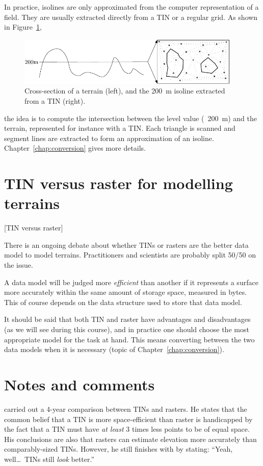 %

In practice, isolines are only approximated from the computer representation of a field.
They are usually extracted directly from a TIN or a regular grid. 
As shown in Figure~\ref{fig:isoline},
\begin{figure}
  \centering
  \includegraphics[width=0.95\textwidth]{figs/isoline}
  \caption{Cross-section of a terrain (left), and the \qty{200}{\metre} isoline extracted from a TIN (right).} 
\label{fig:isoline}
\end{figure}
the idea is to compute the intersection between the level value (\eg\ \qty{200}{m}) and the terrain, represented for instance with a TIN\@. 
Each triangle is scanned and segment lines are extracted to form an approximation of an isoline.
Chapter~\ref{chap:conversion} gives more details.

%
\section{TIN versus raster for modelling terrains}[TIN versus raster]

There is an ongoing debate about whether TINs or rasters are the better data model to model terrains.
Practitioners and scientists are probably split 50/50 on the issue.

A data model will be judged more \emph{efficient} than another if it represents a surface more accurately within the same amount of storage space, measured in bytes.
This of course depends on the data structure used to store that data model.

It should be said that both TIN and raster have advantages and disadvantages (as we will see during this course), and in practice one should choose the most appropriate model for the task at hand.
This means converting between the two data models when it is necessary (topic of Chapter~\ref{chap:conversion}).


%
\section{Notes and comments}

\citet{Kumler94} carried out a 4-year comparison between TINs and rasters.
He states that the common belief that a TIN is more space-efficient than raster is handicapped by the fact that a TIN must have \emph{at least} 3 times less points to be of equal space.
His conclusions are also that rasters can estimate elevation more accurately than comparably-sized TINs.
However, he still finishes with by stating: ``Yeah, well\ldots\ TINs still \emph{look} better.'' 

